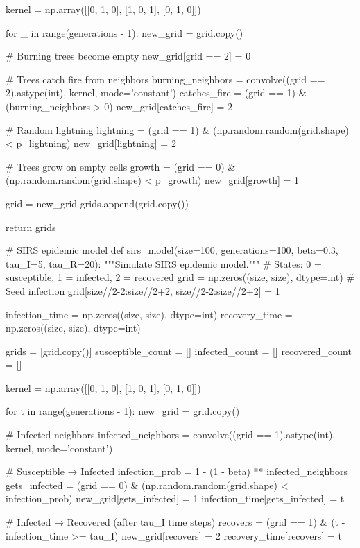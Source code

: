 \documentclass[a4paper, 11pt]{article}
\begin{document}
\begin{pycode}
    kernel = np.array([[0, 1, 0],
                       [1, 0, 1],
                       [0, 1, 0]])

    for _ in range(generations - 1):
        new_grid = grid.copy()

        # Burning trees become empty
        new_grid[grid == 2] = 0

        # Trees catch fire from neighbors
        burning_neighbors = convolve((grid == 2).astype(int), kernel, mode='constant')
        catches_fire = (grid == 1) & (burning_neighbors > 0)
        new_grid[catches_fire] = 2

        # Random lightning
        lightning = (grid == 1) & (np.random.random(grid.shape) < p_lightning)
        new_grid[lightning] = 2

        # Trees grow on empty cells
        growth = (grid == 0) & (np.random.random(grid.shape) < p_growth)
        new_grid[growth] = 1

        grid = new_grid
        grids.append(grid.copy())

    return grids

# SIRS epidemic model
def sirs_model(size=100, generations=100, beta=0.3, tau_I=5, tau_R=20):
    """Simulate SIRS epidemic model."""
    # States: 0 = susceptible, 1 = infected, 2 = recovered
    grid = np.zeros((size, size), dtype=int)
    # Seed infection
    grid[size//2-2:size//2+2, size//2-2:size//2+2] = 1

    infection_time = np.zeros((size, size), dtype=int)
    recovery_time = np.zeros((size, size), dtype=int)

    grids = [grid.copy()]
    susceptible_count = []
    infected_count = []
    recovered_count = []

    kernel = np.array([[0, 1, 0],
                       [1, 0, 1],
                       [0, 1, 0]])

    for t in range(generations - 1):
        new_grid = grid.copy()

        # Infected neighbors
        infected_neighbors = convolve((grid == 1).astype(int), kernel, mode='constant')

        # Susceptible → Infected
        infection_prob = 1 - (1 - beta) ** infected_neighbors
        gets_infected = (grid == 0) & (np.random.random(grid.shape) < infection_prob)
        new_grid[gets_infected] = 1
        infection_time[gets_infected] = t

        # Infected → Recovered (after tau_I time steps)
        recovers = (grid == 1) & (t - infection_time >= tau_I)
        new_grid[recovers] = 2
        recovery_time[recovers] = t


\end{pycode}
\end{document}
